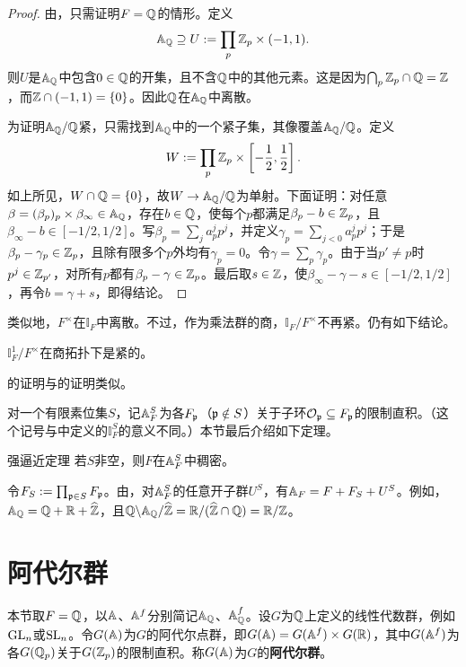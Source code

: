 \begin{proof}
由，只需证明$F=\mathbb{Q}$的情形。定义
\[\mathbb{A}_{\mathbb{Q}}\supseteq U:=\prod_p\mathbb{Z}_p\times(-1,1).\]
则$U$是$\mathbb{A}_{\mathbb{Q}}$中包含$0\in\mathbb{Q}$的开集，且不含$\mathbb{Q}$中的其他元素。这是因为$\bigcap_p\mathbb{Z}_p\cap\mathbb{Q}=\mathbb{Z}$，而$\mathbb{Z}\cap(-1,1)=\{0\}$。因此$\mathbb{Q}$在$\mathbb{A}_{\mathbb{Q}}$中离散。

为证明$\mathbb{A}_{\mathbb{Q}}/\mathbb{Q}$紧，只需找到$\mathbb{A}_{\mathbb{Q}}$中的一个紧子集，其像覆盖$\mathbb{A}_{\mathbb{Q}}/\mathbb{Q}$。定义
\[W:=\prod_p\mathbb{Z}_p\times\left[-\frac12,\frac12\right].\]
如上所见，$W\cap\mathbb{Q}=\{0\}$，故$W\to\mathbb{A}_{\mathbb{Q}}/\mathbb{Q}$为单射。下面证明：对任意$\beta=(\beta_p)_p\times\beta_\infty\in\mathbb{A}_{\mathbb{Q}}$，存在$b\in\mathbb{Q}$，使每个$p$都满足$\beta_p-b\in\mathbb{Z}_p$，且$\beta_\infty-b\in[-1/2,1/2]$。写$\beta_p=\sum_j a_p^jp^j$，并定义$\gamma_p=\sum_{j<0}a_p^jp^j$；于是$\beta_p-\gamma_p\in\mathbb{Z}_p$，且除有限多个$p$外均有$\gamma_p=0$。令$\gamma=\sum_p\gamma_p$。由于当$p'\ne p$时$p^j\in\mathbb{Z}_{p'}$，对所有$p$都有$\beta_p-\gamma\in\mathbb{Z}_p$。最后取$s\in\mathbb{Z}$，使$\beta_\infty-\gamma-s\in[-1/2,1/2]$，再令$b=\gamma+s$，即得结论。
\end{proof}
类似地，$F^\times$在$\mathbb{I}_F$中离散。不过，作为乘法群的商，$\mathbb{I}_F/F^\times$不再紧。仍有如下结论。
\begin{theorem}\label{L4S1O9}
$\mathbb{I}_F^1/F^\times$在商拓扑下是紧的。
\end{theorem}
的证明与的证明类似。

对一个有限素位集$S$，记$\mathbb{A}_F^S$为各$F_{\mathfrak{p}}$（$\mathfrak{p}\notin S$）关于子环$\mathcal O_{\mathfrak{p}}\subseteq F_{\mathfrak{p}}$的限制直积。（这个记号与中定义的$\mathbb{I}_F^S$的意义不同。）本节最后介绍如下定理。
\begin{theorem}{强逼近定理}\label{L4S1O10}
若$S$非空，则$F$在$\mathbb{A}_F^S$中稠密。
\end{theorem}
\begin{note}[L4S1O11]
令$F_S:=\prod_{\mathfrak{p}\in S}F_{\mathfrak{p}}$。由，对$\mathbb{A}_F^S$的任意开子群$U^S$，有$\mathbb{A}_F=F+F_S+U^S$。例如，$\mathbb{A}_{\mathbb{Q}}=\mathbb{Q}+\mathbb{R}+\widehat{\mathbb{Z}}$，且$\mathbb{Q}\backslash\mathbb{A}_{\mathbb{Q}}/\widehat{\mathbb{Z}}=\mathbb{R}/(\widehat{\mathbb{Z}}\cap\mathbb{Q})=\mathbb{R}/\mathbb{Z}$。
\end{note}
\section{阿代尔群}\label{L4S2}
本节取$F=\mathbb{Q}$，以$\mathbb{A}$、$\mathbb{A}^f$分别简记$\mathbb{A}_{\mathbb{Q}}$、$\mathbb{A}_{\mathbb{Q}}^f$。设$G$为$\mathbb{Q}$上定义的线性代数群，例如$\operatorname{GL}_n$或$\operatorname{SL}_n$。令$G(\mathbb{A})$为$G$的阿代尔点群，即$G(\mathbb{A})=G(\mathbb{A}^f)\times G(\mathbb{R})$，其中$G(\mathbb{A}^f)$为各$G(\mathbb{Q}_p)$关于$G(\mathbb{Z}_p)$的限制直积。称$G(\mathbb{A})$为$G$的\textbf{阿代尔群}。


